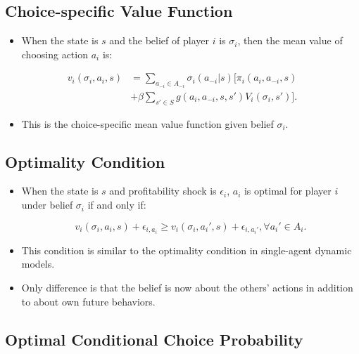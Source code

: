 \documentclass[]{book}
\providecommand{\tightlist}{%
  \setlength{\itemsep}{0pt}\setlength{\parskip}{0pt}}
\begin{document}
\subsection{Choice-specific Value
Function}\label{choice-specific-value-function-1}

\begin{itemize}
\tightlist
\item
  When the state is \(s\) and the belief of player \(i\) is
  \(\sigma_i\), then the mean value of choosing action \(a_i\) is:
\end{itemize}

\begin{equation}
\begin{split}
v_i(\sigma_i, a_i, s) &= \sum_{a_{-i} \in A_{-i}} \sigma_i(a_{-i}|s)[ \pi_i(a_i, a_{-i}, s) \\
&+ \beta \sum_{s' \in S} g(a_i, a_{-i}, s, s') V_i(\sigma_i, s')].
\end{split}
\end{equation}

\begin{itemize}
\tightlist
\item
  This is the choice-specific mean value function given belief
  \(\sigma_i\).
\end{itemize}

\subsection{Optimality Condition}\label{optimality-condition-2}

\begin{itemize}
\tightlist
\item
  When the state is \(s\) and profitability shock is \(\epsilon_i\),
  \(a_i\) is optimal for player \(i\) under belief \(\sigma_i\) if and
  only if:

  \begin{equation}
  v_i(\sigma_i, a_i, s) + \epsilon_{i, a_i} \ge  v_i(\sigma_i, a_i', s) + \epsilon_{i, a_i'}, \forall a_i' \in A_i.
  \end{equation}
\item
  This condition is similar to the optimality condition in single-agent
  dynamic models.
\item
  Only difference is that the belief is now about the others' actions in
  addition to about own future behaviors.
\end{itemize}

\subsection{Optimal Conditional Choice
Probability}\label{optimal-conditional-choice-probability-2}
\end{document}
